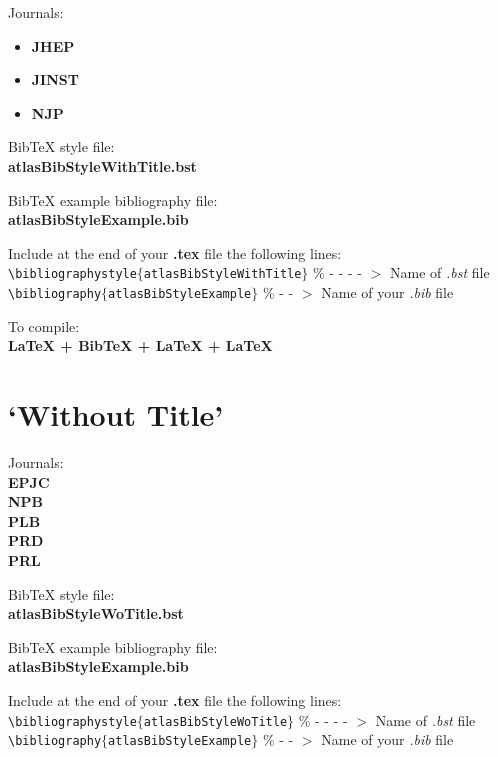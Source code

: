 \documentclass{../atlasnote}
\begin{document}
Journals:
\begin{itemize}
\item \textbf{JHEP}
\item \textbf{JINST}
\item \textbf{NJP}
\end{itemize}

\bigskip
\noindent BibTeX style file: \\
\indent \textbf{atlasBibStyleWithTitle.bst}

\bigskip
\noindent BibTeX example bibliography file: \\
\indent \textbf{atlasBibStyleExample.bib}

\bigskip
\noindent Include at the end of your \textbf{.tex} file the following lines: \\
\indent \texttt{\textbackslash bibliographystyle$\{$atlasBibStyleWithTitle$\}$}  \% - - - - $>$ Name of \emph{.bst} file \\
\indent \texttt{\textbackslash bibliography$\{$atlasBibStyleExample$\}$}  \% - - $>$ Name of your \emph{.bib} file

\bigskip
\noindent To compile: \\
\indent \textbf{LaTeX + BibTeX + LaTeX + LaTeX} 


\section{`Without Title'}

Journals: \\
\indent \textbf{EPJC} \\
\indent \textbf{NPB} \\
\indent \textbf{PLB} \\
\indent \textbf{PRD} \\
\indent \textbf{PRL}

\bigskip
\noindent BibTeX style file: \\
\indent \textbf{atlasBibStyleWoTitle.bst}

\bigskip
\noindent BibTeX example bibliography file: \\
\indent \textbf{atlasBibStyleExample.bib}

\bigskip
\noindent Include at the end of your \textbf{.tex} file the following lines: \\
\indent \texttt{\textbackslash bibliographystyle$\{$atlasBibStyleWoTitle$\}$}  \% - - - - $>$ Name of \emph{.bst} file \\
\indent \texttt{\textbackslash bibliography$\{$atlasBibStyleExample$\}$}  \% - - $>$ Name of your \emph{.bib} file
\end{document}
